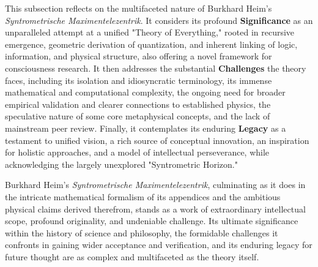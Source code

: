\documentclass[12pt]{article}
\begin{document}
This subsection reflects on the multifaceted nature of Burkhard Heim’s \textit{Syntrometrische Maximentelezentrik}. It considers its profound \textbf{Significance} as an unparalleled attempt at a unified "Theory of Everything," rooted in recursive emergence, geometric derivation of quantization, and inherent linking of logic, information, and physical structure, also offering a novel framework for consciousness research. It then addresses the substantial \textbf{Challenges} the theory faces, including its isolation and idiosyncratic terminology, its immense mathematical and computational complexity, the ongoing need for broader empirical validation and clearer connections to established physics, the speculative nature of some core metaphysical concepts, and the lack of mainstream peer review. Finally, it contemplates its enduring \textbf{Legacy} as a testament to unified vision, a rich source of conceptual innovation, an inspiration for holistic approaches, and a model of intellectual perseverance, while acknowledging the largely unexplored "Syntrometric Horizon."

Burkhard Heim’s \textit{Syntrometrische Maximentelezentrik}, culminating as it does in the intricate mathematical formalism of its appendices and the ambitious physical claims derived therefrom, stands as a work of extraordinary intellectual scope, profound originality, and undeniable challenge. Its ultimate significance within the history of science and philosophy, the formidable challenges it confronts in gaining wider acceptance and verification, and its enduring legacy for future thought are as complex and multifaceted as the theory itself.
\end{document}
